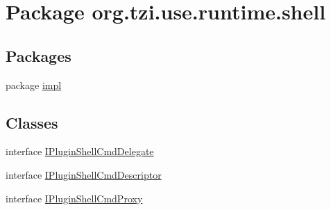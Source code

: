 \hypertarget{namespaceorg_1_1tzi_1_1use_1_1runtime_1_1shell}{\section{Package org.\-tzi.\-use.\-runtime.\-shell}
\label{namespaceorg_1_1tzi_1_1use_1_1runtime_1_1shell}
}
\subsection*{Packages}
\begin{DoxyCompactItemize}
\item 
package \hyperlink{namespaceorg_1_1tzi_1_1use_1_1runtime_1_1shell_1_1impl}{impl}
\end{DoxyCompactItemize}
\subsection*{Classes}
\begin{DoxyCompactItemize}
\item 
interface \hyperlink{interfaceorg_1_1tzi_1_1use_1_1runtime_1_1shell_1_1_i_plugin_shell_cmd_delegate}{I\-Plugin\-Shell\-Cmd\-Delegate}
\item 
interface \hyperlink{interfaceorg_1_1tzi_1_1use_1_1runtime_1_1shell_1_1_i_plugin_shell_cmd_descriptor}{I\-Plugin\-Shell\-Cmd\-Descriptor}
\item 
interface \hyperlink{interfaceorg_1_1tzi_1_1use_1_1runtime_1_1shell_1_1_i_plugin_shell_cmd_proxy}{I\-Plugin\-Shell\-Cmd\-Proxy}
\end{DoxyCompactItemize}
